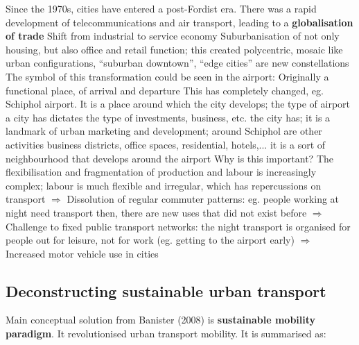 \documentclass{article}
\begin{document}
\begin{outline}
	\1 Since the 1970s, cities have entered a post-Fordist era. There was a rapid development of telecommunications and air transport, leading to a \textbf{globalisation of trade}
	\1 Shift from industrial to service economy
	\1 Suburbanisation of not only housing, but also office and retail function; this created polycentric, mosaic like urban configurations, ``suburban downtown'', ``edge cities'' are new constellations
	\1 The symbol of this transformation could be seen in the airport:
		\2 Originally a functional place, of arrival and departure
		\2 This has completely changed, eg. Schiphol airport. It is a place around which the city develops; the type of airport a city has dictates the type of investments, business, etc. the city has; it is a landmark of urban marketing and development; around Schiphol are other activities business districts, office spaces, residential, hotels,... it is a sort of neighbourhood that develops around the airport
	\1 Why is this important? The flexibilisation and fragmentation of production and labour is increasingly complex; labour is much flexible and irregular, which has repercussions on transport 
	\1 $\Rightarrow$ Dissolution of regular commuter patterns: eg. people working at night need transport then, there are new uses that did not exist before
	\1 $\Rightarrow$ Challenge to fixed public transport networks: the night transport is organised for people out for leisure, not for work (eg. getting to the airport early)
	\1 $\Rightarrow$ Increased motor vehicle use in cities
\end{outline}

\subsection{Deconstructing sustainable urban transport}

Main conceptual solution from Banister (2008) is \textbf{sustainable mobility paradigm}. It revolutionised urban transport mobility.
It is summarised as:
\end{document}
